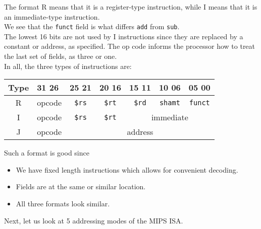 \documentclass{article}
\begin{document}
		The format R means that it is a register-type instruction, while I means that it is an immediate-type instruction.\\
		We see that the \texttt{funct} field is what differs \texttt{add} from \texttt{sub}.\\
		The lowest 16 bits are not used by I instructions since they are replaced by a constant or address, as specified. The op code informs the processor how to treat the last set of fields, as three or one.\\

		In all, the three types of instructions are:
		\begin{center}
		\begin{tabular}{|c||p{2cm}|p{1.6cm}|p{1.6cm}|p{1.6cm}|p{1.6cm}|p{2cm}|}
			\hline
			Type & 31 \hfill 26 & 25 \hfill 21 & 20 \hfill 16 & 15 \hfill 11 & 10 \hfill 06 & 05 \hfill 00 \\ \hline
			R & \multicolumn{1}{c|}{opcode} & \multicolumn{1}{c|}{\texttt{\$rs}} & \multicolumn{1}{c|}{\texttt{\$rt}} & \multicolumn{1}{c|}{\texttt{\$rd}} & \multicolumn{1}{c|}{\texttt{shamt}} & \multicolumn{1}{c|}{\texttt{funct}} \\ \hline
			I & \multicolumn{1}{c|}{opcode} & \multicolumn{1}{c|}{\texttt{\$rs}} & \multicolumn{1}{c|}{\texttt{\$rt}} & \multicolumn{3}{c|}{immediate} \\ \hline
			J & \multicolumn{1}{c|}{opcode} & \multicolumn{5}{c|}{address} \\ \hline
		\end{tabular}
		\end{center}

		Such a format is good since
		\begin{itemize}
			\item We have fixed length instructions which allows for convenient decoding.
			\item Fields are at the same or similar location.
			\item All three formats look similar.
		\end{itemize}

		Next, let us look at 5 addressing modes of the MIPS ISA.
\end{document}
